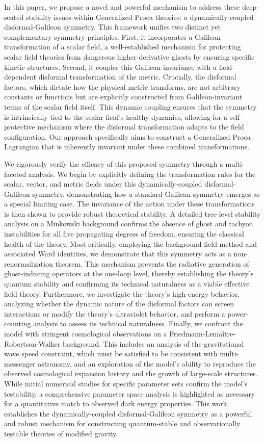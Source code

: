 \documentclass[twocolumn]{aastex631}
\begin{document}
In this paper, we propose a novel and powerful mechanism to address these deep-seated stability issues within Generalized Proca theories: a dynamically-coupled disformal-Galileon symmetry. This framework unifies two distinct yet complementary symmetry principles. First, it incorporates a Galilean transformation of a scalar field, a well-established mechanism for protecting scalar field theories from dangerous higher-derivative ghosts by ensuring specific kinetic structures. Second, it couples this Galilean invariance with a field-dependent disformal transformation of the metric. Crucially, the disformal factors, which dictate how the physical metric transforms, are not arbitrary constants or functions but are explicitly constructed from Galileon-invariant terms of the scalar field itself. This dynamic coupling ensures that the symmetry is intrinsically tied to the scalar field's healthy dynamics, allowing for a self-protective mechanism where the disformal transformation adapts to the field configuration. Our approach specifically aims to construct a Generalized Proca Lagrangian that is inherently invariant under these combined transformations.

We rigorously verify the efficacy of this proposed symmetry through a multi-faceted analysis. We begin by explicitly defining the transformation rules for the scalar, vector, and metric fields under this dynamically-coupled disformal-Galileon symmetry, demonstrating how a standard Galilean symmetry emerges as a special limiting case. The invariance of the action under these transformations is then shown to provide robust theoretical stability. A detailed tree-level stability analysis on a Minkowski background confirms the absence of ghost and tachyon instabilities for all five propagating degrees of freedom, ensuring the classical health of the theory. Most critically, employing the background field method and associated Ward identities, we demonstrate that this symmetry acts as a non-renormalization theorem. This mechanism prevents the radiative generation of ghost-inducing operators at the one-loop level, thereby establishing the theory's quantum stability and confirming its technical naturalness as a viable effective field theory. Furthermore, we investigate the theory's high-energy behavior, analyzing whether the dynamic nature of the disformal factors can screen interactions or modify the theory's ultraviolet behavior, and perform a power-counting analysis to assess its technical naturalness. Finally, we confront the model with stringent cosmological observations on a Friedmann-Lemaître-Robertson-Walker background. This includes an analysis of the gravitational wave speed constraint, which must be satisfied to be consistent with multi-messenger astronomy, and an exploration of the model's ability to reproduce the observed cosmological expansion history and the growth of large-scale structures. While initial numerical studies for specific parameter sets confirm the model's testability, a comprehensive parameter space analysis is highlighted as necessary for a quantitative match to observed dark energy properties. This work establishes the dynamically-coupled disformal-Galileon symmetry as a powerful and robust mechanism for constructing quantum-stable and observationally testable theories of modified gravity.
\end{document}

